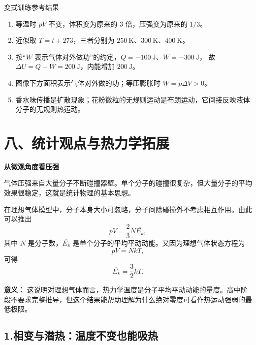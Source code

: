 \begin{learningbox}{变式训练参考结果}
\begin{enumerate}[itemsep=0.45em,topsep=0.3em,parsep=0pt]
  \item 等温时 $pV$ 不变，体积变为原来的 3 倍，压强变为原来的 $1/3$。
  \item 近似取 $T=t+273$，三者分别为 $250\ \mathrm K$、$300\ \mathrm K$、$400\ \mathrm K$。
  \item 按“$W$ 表示气体对外做功”的约定，$Q=-100\ \mathrm J$、$W=-300\ \mathrm J$，
  故 $\Delta U=Q-W=200\ \mathrm J$，内能增加 $200\ \mathrm J$。
  \item 图像下方面积表示气体对外做的功；等压膨胀时 $W=p\Delta V>0$。
  \item 香水味传播是扩散现象；花粉微粒的无规则运动是布朗运动，它间接反映液体分子的无规则热运动。
\end{enumerate}
\end{learningbox}

\begin{center}

\end{center}

\section*{八、统计观点与热力学拓展}
\begin{competitionbox}
\textbf{从微观角度看压强}

气体压强来自大量分子不断碰撞器壁。单个分子的碰撞很复杂，但大量分子的平均效果很稳定，这就是统计物理的基本思想。

在理想气体模型中，分子本身大小可忽略，分子间除碰撞外不考虑相互作用。由此可以推出
\[
pV=\frac23N\overline{E_k},
\]
其中 $N$ 是分子数，$\overline{E_k}$ 是单个分子的平均平动动能。又因为理想气体状态方程为
\[
pV=NkT,
\]
可得
\[
\overline{E_k}=\frac32kT.
\]

\textbf{意义：} 这说明对理想气体而言，热力学温度是分子平均平动动能的量度。高中阶段不要求完整推导，但这个结果能帮助理解为什么绝对零度可看作热运动强弱的最低极限。

\begin{center}


\label{fig:gas-pressure-micro}
\end{center}
\end{competitionbox}

\subsection*{1.\quad 相变与潜热：温度不变也能吸热}

